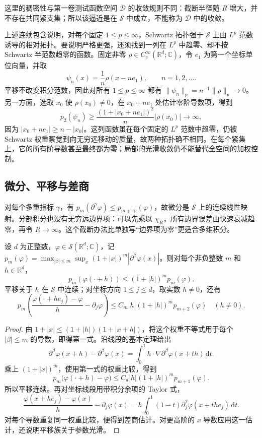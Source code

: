 这里的稠密性与第一卷测试函数空间 \(\mathcal D\) 的收敛规则不同：截断半径随 \(R\) 增大，并不存在共同紧支集；所以该逼近是在 \(\mathcal S\) 中成立，不能称为 \(\mathcal D\) 中的收敛。

\ProseParagraphBreak

上述连续包含说明，对每个固定 \(1\leq p\leq\infty\)，Schwartz 拓扑强于 \(\mathcal S\) 上由 \(L^p\) 范数诱导的相对拓扑。要说明严格更强，还须找到一列在 \(L^p\) 中趋零、却不按 Schwartz 半范数趋零的函数。固定非零 \(\rho\in C_c^\infty(\mathbb R^d;\mathbb C)\)，令 \(e_1\) 为第一个坐标单位向量，并取
\[
 \psi_n(x)=\frac1n\rho(x-ne_1),\qquad n=1,2,\ldots.
\]
平移不改变积分范数，因此对所有 \(1\leq p\leq\infty\) 都有 \(\|\psi_n\|_p=n^{-1}\|\rho\|_p\to0\)。另一方面，选取 \(x_0\) 使 \(\rho(x_0)\ne0\)，在 \(x_0+ne_1\) 处估计零阶导数项，得到
\[
 p_2(\psi_n)\geq\frac{(1+|x_0+ne_1|)^2}{n}|\rho(x_0)|\longrightarrow\infty,
\]
因为 \(|x_0+ne_1|\geq n-|x_0|\)。这列函数虽在每个固定的 \(L^p\) 范数中趋零，仍被 Schwartz 权重察觉到向无穷远移动的质量，故两种拓扑确不相同。在每个紧集上，它的所有阶导数甚至最终都为零；局部的光滑收敛仍不能替代全空间的加权控制。

\subsection{微分、平移与差商}
\label{b2:subsec:050103}

对每个多重指标 \(\gamma\)，有 \(p_m(\partial^\gamma\varphi)\leq p_{m+|\gamma|}(\varphi)\)，故微分是 \(\mathcal S\) 上的连续线性映射。分部积分也没有无穷远边界项：可以先乘以 \(\chi_R\)，所有边界误差由快速衰减趋零，再令 \(R\to\infty\)。这个截断办法比单独写“边界项为零”更适合多维积分。

\begin{lemma}[平移与差商的半范数估计]\label{b2:lem:05-schwartz-translations}
设 \(d\) 为正整数，\(\varphi\in\mathcal S(\mathbb R^d;\mathbb C)\)，记 \(p_m(\varphi)=\max_{|\beta|\leq m}\sup_x(1+|x|)^m|\partial^\beta\varphi(x)|\)。则对每个非负整数 \(m\) 和 \(h\in\mathbb R^d\)，
\[
 p_m(\varphi(\cdot+h))\leq(1+|h|)^m p_m(\varphi).
\]
平移关于 \(h\) 在 \(\mathcal S\) 中连续；对坐标方向 \(1\leq j\leq d\)，取实数 \(h\ne0\)，还有
\[
 p_m\left(\frac{\varphi(\cdot+he_j)-\varphi}{h}-\partial_j\varphi\right)
 \leq C_m|h|(1+|h|)^m p_{m+2}(\varphi)\quad(h\ne0).
\]
\end{lemma}
\begin{proof}
由 \(1+|x|\leq(1+|h|)(1+|x+h|)\)，将这个权重不等式用于每个 \(|\beta|\leq m\) 的导数，即得第一式。沿线段的基本定理给出
\[
 \partial^\beta\varphi(x+h)-\partial^\beta\varphi(x)
 =\int_0^1 h\cdot\nabla\partial^\beta\varphi(x+th)\,\mathrm{d}t.
\]
乘上 \((1+|x|)^m\)，使用第一式的权重比较，得到
\[
 p_m\bigl(\varphi(\mathord\cdot+h)-\varphi\bigr)
 \le C_d|h|(1+|h|)^m p_{m+1}(\varphi).
\]
所以平移连续。再对坐标线段用带积分余项的 Taylor 式，
\[
 \frac{\varphi(x+he_j)-\varphi(x)}h-\partial_j\varphi(x)
 =h\int_0^1(1-t)\partial_j^2\varphi(x+the_j)\,\mathrm{d}t.
\]
对每个导数重复同一权重比较，便得到差商估计。对更高阶的 \(x\) 导数应用这一估计，还说明平移族关于参数光滑。
\end{proof}

